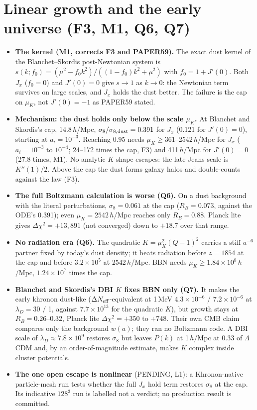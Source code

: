 \documentclass[10pt]{article}
\begin{document}
\section{Linear growth and the early universe (F3, M1, Q6, Q7)}
\begin{itemize}
\item \textbf{The kernel (M1, corrects F3 and PAPER59).} The exact dust kernel of the Blanchet--Skordis post-Newtonian system is $s(k;f_0)=(\mu^2-f_0k^2)/((1-f_0)k^2+\mu^2)$ with $f_0=1+J'(0)$. Both $J_x$ ($f_0=0$) and $J'(0)=0$ give $s\to1$ as $k\to0$: the Newtonian term survives on large scales, and $J_x$ holds the dust better. The failure is the cap on $\mu_K$, not $J'(0)=-1$ as PAPER59 stated.
\item \textbf{Mechanism: the dust holds only below the scale $\mu_K$.} At Blanchet and Skordis's cap, 14.8\,$h$/Mpc, $\sigma_8/\sigma_{8,\rm dust}=0.391$ for $J_x$ (0.121 for $J'(0)=0$), starting at $a_i=10^{-3}$. Reaching 0.95 needs $\mu_K\ge361$--2542\,$h$/Mpc for $J_x$ ($a_i=10^{-3}$ to $10^{-4}$; 24--172 times the cap, F3) and 411\,$h$/Mpc for $J'(0)=0$ (27.8 times, M1). No analytic $K$ shape escapes: the late Jeans scale is $K''(1)/2$. Above the cap the dust forms galaxy halos and double-counts against the law (F3).
\item \textbf{The full Boltzmann calculation is worse (Q6).} On a dust background with the literal perturbations, $\sigma_8=0.061$ at the cap ($R_B=0.073$, against the ODE's 0.391); even $\mu_K=2542$\,$h$/Mpc reaches only $R_B=0.88$. Planck lite gives $\Delta\chi^2=+13{,}891$ (not converged) down to $+18.7$ over that range.
\item \textbf{No radiation era (Q6).} The quadratic $K=\mu_K^2(Q-1)^2$ carries a stiff $a^{-6}$ partner fixed by today's dust density; it beats radiation before $z=1854$ at the cap and before $3.2\times10^{5}$ at 2542\,$h$/Mpc. BBN needs $\mu_K\ge1.84\times10^{8}$\,$h$/Mpc, $1.24\times10^{7}$ times the cap.
\item \textbf{Blanchet and Skordis's DBI $K$ fixes BBN only (Q7).} It makes the early khronon dust-like ($\Delta N_{\rm eff}$-equivalent at 1\,MeV $4.3\times10^{-6}$ / $7.2\times10^{-6}$ at $\lambda_D=30$ / 1, against $7.7\times10^{13}$ for the quadratic $K$), but growth stays at $R_B=0.26$--0.32, Planck lite $\Delta\chi^2=+350$ to $+748$. Their own CMB claim compares only the background $w(a)$; they ran no Boltzmann code. A DBI scale of $\lambda_D\approx7.8\times10^{9}$ restores $\sigma_8$ but leaves $P(k)$ at 1\,$h$/Mpc at 0.33 of $\Lambda$CDM and, by an order-of-magnitude estimate, makes $K$ complex inside cluster potentials.
\item \textbf{The one open escape is nonlinear} (PENDING, L1): a Khronon-native particle-mesh run tests whether the full $J_x$ hold term restores $\sigma_8$ at the cap. Its indicative $128^3$ run is labelled not a verdict; no production result is committed.
\end{itemize}
\end{document}
